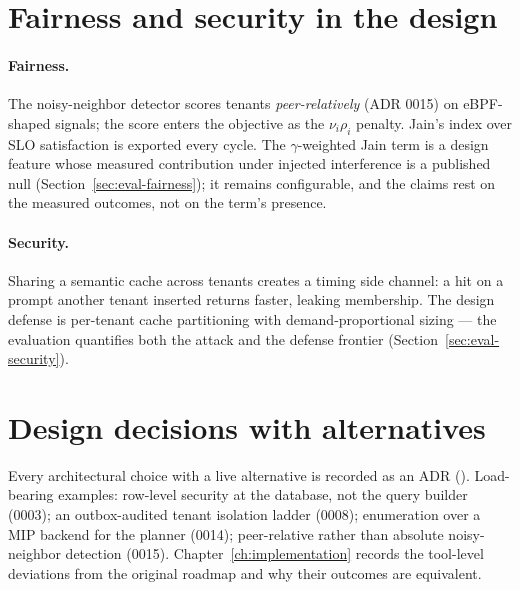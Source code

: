 \section{Fairness and security in the design}

\paragraph{Fairness.} The noisy-neighbor detector scores tenants
\emph{peer-relatively} (ADR 0015) on eBPF-shaped signals; the score enters
the objective as the $\nu_i\rho_i$ penalty. Jain's index over SLO
satisfaction is exported every cycle. The $\gamma$-weighted Jain term is a
design feature whose measured contribution under injected interference is a
published null (Section~\ref{sec:eval-fairness}); it remains configurable,
and the claims rest on the measured outcomes, not on the term's presence.

\paragraph{Security.} Sharing a semantic cache across tenants creates a
timing side channel: a hit on a prompt another tenant inserted returns
faster, leaking membership. The design defense is per-tenant cache
partitioning with demand-proportional sizing --- the evaluation quantifies
both the attack and the defense frontier
(Section~\ref{sec:eval-security}).

\section{Design decisions with alternatives}

Every architectural choice with a live alternative is recorded as an ADR
(). Load-bearing examples: row-level security at
the database, not the query builder (0003); an outbox-audited tenant
isolation ladder (0008); enumeration over a MIP backend for the planner
(0014); peer-relative rather than absolute noisy-neighbor detection (0015).
Chapter~\ref{ch:implementation} records the tool-level deviations from the
original roadmap and why their outcomes are equivalent.
